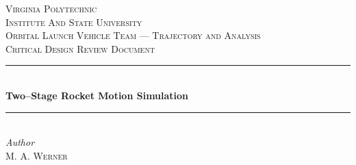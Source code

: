 \documentclass[11pt]{thesis}
\numberwithin{equation}{section}
\begin{document}
\begin{titlepage} %
	\newcommand{\HRule}{\rule{\linewidth}{0.5mm}} %
	
	\center %
	
	\textsc{\LARGE Virginia Polytechnic\\Institute And State University}\\[1.5cm] %
	
	\textsc{\Large Orbital Launch Vehicle Team --- Trajectory and Analysis}\\[0.5cm] %
	
	\textsc{\large Critical Design Review Document}\\[0.5cm] %
	
	\HRule\\[0.4cm]%

	{\huge\bfseries Two--Stage Rocket Motion Simulation}\\[0.0cm]%
	
	\HRule\\[1.5cm]
	
	
	{\large\textit{Author}}\\
	M. A. \textsc{Werner} %
	

\end{titlepage}
\end{document}
